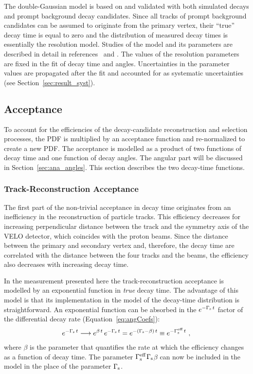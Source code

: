 The double-Gaussian model is based on and validated with both simulated \BstoJpsiKK{} decays and prompt background decay candidates. Since
all tracks of prompt background candidates can be assumed to originate from the primary vertex, their ``true'' decay time is equal to zero
and the distribution of measured decay times is essentially the resolution model. Studies of the model and its parameters are described in
detail in references~\cite{Aaij:2015} and \cite{LHCb-ANA-2014-039}. The values of the resolution parameters are fixed in the fit of decay
time and angles. Uncertainties in the parameter values are propagated after the fit and accounted for as systematic uncertainties (see
Section~\ref{sec:result_syst}).


\subsection{Acceptance}
\label{subsec:ana_time_acc}

To account for the efficiencies of the decay-candidate reconstruction and selection processes, the PDF is multiplied by an acceptance
function and re-normalized to create a new PDF. The acceptance is modelled as a product of two functions of decay time and one function of
decay angles. The angular part will be discussed in Section~\ref{sec:ana_angles}. This section describes the two decay-time functions.

\subsubsection{Track-Reconstruction Acceptance}
The first part of the non-trivial acceptance in decay time originates from an inefficiency in the reconstruction of particle tracks. This
efficiency decreases for increasing perpendicular distance between the track and the symmetry axis of the VELO detector, which coincides
with the proton beams. Since the distance between the primary and secondary vertex and, therefore, the decay time are correlated with the
distance between the four \BstoJpsiKK{} tracks and the beams, the efficiency also decreases with increasing decay time.

In the measurement presented here the track-reconstruction acceptance is modelled by an exponential function in \emph{true} decay time. The
advantage of this model is that its implementation in the model of the decay-time distribution is straightforward. An exponential function
can be absorbed in the $e^{-\Gamma_\text{s}\,t}$ factor of the differential decay rate (Equation~\ref{eq:angCoefs}):
\begin{equation}
  e^{-\Gamma_\text{s}\,t} \longrightarrow e^{\beta\,t}\,e^{-\Gamma_\text{s}\,t} = e^{-(\Gamma_\text{s}-\beta)\,t} \equiv e^{-\Gamma_\text{s}^\text{eff}\,t}\ ,
\end{equation}
where $\beta$ is the parameter that quantifies the rate at which the efficiency changes as a function of decay time. The parameter
$\Gamma_\text{s}^\text{eff}$\textequiv$\Gamma_\text{s}$\textminus$\beta$ can now be included in the model in the place of the parameter $\Gamma_\text{s}$.

